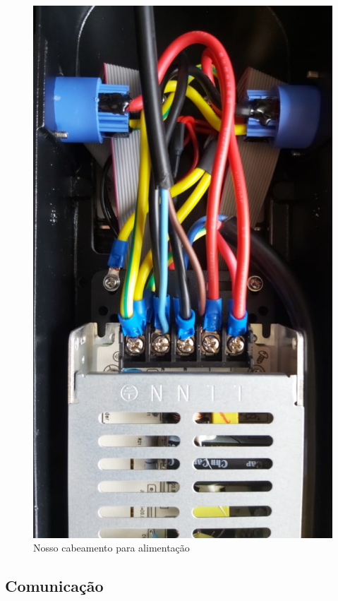 \documentclass[12pt, a4paper]{article}
\begin{document}
\begin{figure}[!htb]
	\centering
	\includegraphics[height=.88\textheight]{painel2.jpeg}
	\caption{\label{fig:painel2.jpeg}Nosso cabeamento para alimentação}
\end{figure}

\clearpage

\subsection{Comunicação}\label{Comunicação}
\end{document}
